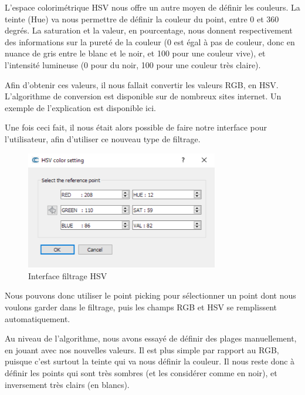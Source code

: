 \documentclass[12pt,titlepage,french]{article}
\begin{document}
L'espace colorimétrique HSV nous offre un autre moyen de définir les couleurs.  La teinte (Hue) va nous permettre de définir la couleur du point, entre 0 et 360 degrés. La saturation et la valeur, en pourcentage, nous donnent respectivement des informations sur la pureté de la couleur (0 est égal à pas de couleur, donc en nuance de gris entre le blanc et le noir, et 100 pour une couleur vive), et l'intensité lumineuse (0 pour du noir, 100 pour une couleur très claire). \newline

Afin d'obtenir ces valeurs, il nous fallait convertir les valeurs RGB, en HSV. L'algorithme de conversion est disponible sur de nombreux sites internet. Un exemple de l'explication est disponible \cite{B01} ici. \newline

Une fois ceci fait, il nous était alors possible de faire notre interface pour l'utilisateur, afin d'utiliser ce nouveau type de filtrage.

\begin{figure}[H]
 \caption{\label{} Interface filtrage HSV}
 \begin{center}
 \includegraphics[width=0.75\textwidth]{./img/ui_hsv.PNG}
  \end{center}
\end{figure}

Nous pouvons donc utiliser le point picking pour sélectionner un point dont nous voulons garder dans le filtrage, puis les champs RGB et HSV se remplissent automatiquement. \newline

Au niveau de l'algorithme, nous avons essayé de définir des plages manuellement, en jouant avec nos nouvelles valeurs. Il est plus simple par rapport au RGB, puisque c'est surtout la teinte qui va nous définir la couleur. Il nous reste donc à définir les points qui sont très sombres (et les considérer comme en noir), et inversement très clairs (en blancs). \newline
\end{document}
